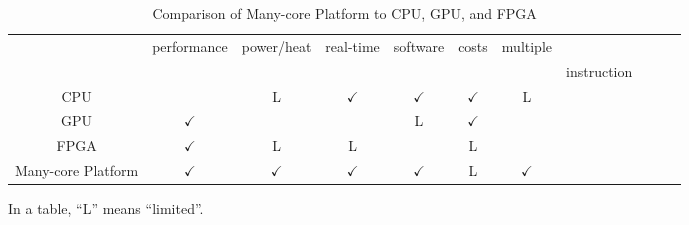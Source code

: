 \begin{landscape}
  \begin{table}[!htbp]
    \caption{\label{tb:comparison_platforms}
      Comparison of Many-core Platform to CPU, GPU, and FPGA}
    \centering
    \begin{tabular}{c|cccccccccc}
      \hline
      & \multirow{2}{*}{performance} & \multirow{2}{*}{power/heat} & \multirow{2}{*}{real-time} & software & \multirow{2}{*}{costs} & multiple\\
      &&&&& development && instruction \\
      \hline
      \hline
      CPU & & L & \(\checkmark\) & \(\checkmark\) & \(\checkmark\) & L \\
      GPU & \(\checkmark\) &  &  & L & \(\checkmark\)\\
      FPGA & \(\checkmark\) & L & L &  & L & \\
      Many-core Platform & \(\checkmark\) & \(\checkmark\) & \(\checkmark\) & \(\checkmark\) & L & \(\checkmark\) \\
      \hline
    \end{tabular}
    \begin{flushright}
         \textasteriskcentered In a table, ``L'' means ``limited''.
    \end{flushright}
  \end{table}


\end{landscape}
